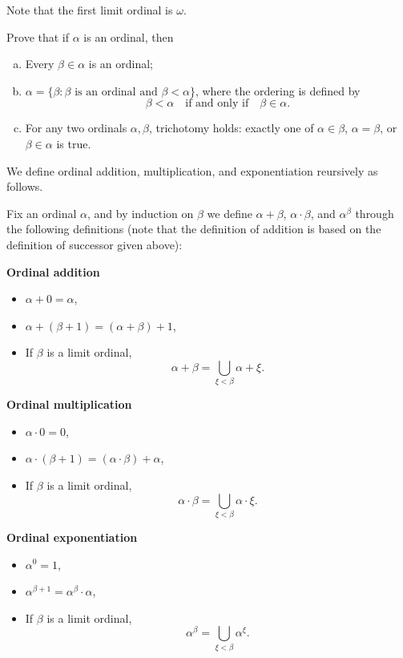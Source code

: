 Note that the first limit ordinal is $\omega$.

\begin{exercise}
 Prove that if $\alpha$ is an ordinal, then
\begin{enumerate}[(a)]
    \item Every $\beta \in \alpha$ is an ordinal;
    \item $\alpha = \{\beta  : \text{$\beta$ is an ordinal and } \beta < \alpha\}$, where the ordering is defined by
    \[
    \beta < \alpha\quad\text{if and only if}\quad  \beta \in \alpha.
    \]
    \item For any two ordinals $\alpha, \beta$, trichotomy holds: exactly one of $\alpha \in \beta$, $\alpha = \beta$, or $\beta \in \alpha$ is true.
\end{enumerate}
\end{exercise}



We define ordinal addition, multiplication, and exponentiation reursively as follows.

Fix an ordinal $\alpha$, and by induction on $\beta$ we define $\alpha+\beta$, $\alpha\cdot\beta$, and $\alpha^\beta$ through the following definitions (note that the definition of addition is based on the definition of successor given above):

\textbf{Ordinal addition}
\begin{itemize}
\item
  $\alpha+0=\alpha$,
\item
  $\alpha+(\beta+1)=(\alpha+\beta)+1$,
\item
  If $\beta$ is a limit ordinal,
  \[
    \alpha+\beta=\bigcup_{\xi<\beta}\alpha+\xi.
  \]
\end{itemize}

\textbf{Ordinal multiplication}
\begin{itemize}
\item
  $\alpha\cdot 0=0$,
\item
  $\alpha\cdot(\beta+1)=(\alpha\cdot\beta)+\alpha$,
\item
  If $\beta$ is a limit ordinal,
  \[
    \alpha\cdot\beta=\bigcup_{\xi<\beta}\alpha\cdot\xi.
  \]
\end{itemize}

\textbf{Ordinal exponentiation}
\begin{itemize}
\item
  $\alpha^0=1$,
\item
  $\alpha^{\beta+1}=\alpha^\beta\cdot\alpha$,
\item
  If $\beta$ is a limit ordinal,
  \[
    \alpha^\beta=\bigcup_{\xi<\beta}\alpha^\xi.
  \]
\end{itemize}

